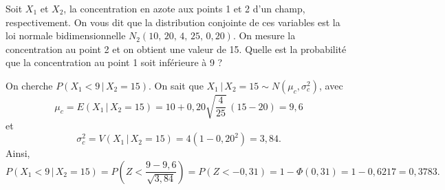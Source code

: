 \begin{exercice}
Soit $X_1$ et $X_2$, la concentration en azote aux points 1 et 2 d'un champ, respectivement.
On vous dit que la distribution conjointe de ces variables est la loi normale bidimensionnelle
$N_2(10,\,20,\,4,\,25,\,0,\!20)$. On mesure la concentration au point 2 et on obtient une
valeur de 15. Quelle est la probabilité que la concentration au point 1 soit inférieure à 9 ?
\begin{solution}
On cherche $P(X_1<9\,|\,X_2=15)$. On sait que $X_1\,|\,X_2=15\sim N(\mu_c,\sigma_c^2)$, avec
\[
  \mu_c=E(X_1\,|\,X_2=15)=10+0,20\sqrt{\frac{4}{25}}\,(15-20)=9,6
\]
et
\[
  \sigma_c^2=V(X_1\,|\,X_2=15)=4\left(1-0,20^2\right)=3,84.
\]
Ainsi,
\[
  P(X_1<9\,|\,X_2=15)=P\!\left(Z<\frac{9-9,6}{\sqrt{3,84}}\right)=P(Z<-0,31)
  =1-\Phi(0,31)=1-0,6217=0,3783.
\]
\end{solution}
\end{exercice}

